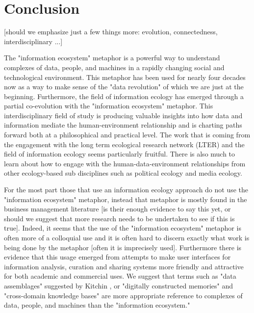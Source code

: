 \section{Conclusion}

[should we emphasize just a few things more: evolution, connectedness, interdisciplinary ...]

The "information ecosystem" metaphor is a powerful way to understand complexes of data, people, and machines in a rapidly changing social and technological environment. This metaphor has been used for nearly four decades now as a way to make sense of the "data revolution" of which we are just at the beginning. Furthermore, the field of information ecology has emerged through a partial co-evolution with the "information ecosystem" metaphor. This interdisciplinary field of study is producing valuable insights into how data and information mediate the human-environment relationship and is charting paths forward both at a philosophical and practical level. The work that is coming from the engagement with the long term ecological research network (LTER) and the field of information ecology seems particularly fruitful. There is also much to learn about how to engage with the human-data-environment relationships from other ecology-based sub disciplines such as political ecology and media ecology. 

For the most part those that use an information ecology approach do not use the "information ecosystem" metaphor, instead that metaphor is mostly found in the business management literature [is their enough evidence to say this yet, or should we suggest that more research needs to be undertaken to see if this is true]. Indeed, it seems that the use of the "information ecosystem" metaphor is often more of a colloquial use and it is often hard to discern exactly what work is being done by the metaphor [often it is imprecisely used]. Furthermore there is evidence that this usage emerged from attempts to make user interfaces for information analysis, curation and sharing systems more friendly and attractive for both academic and commercial uses. We suggest that terms such as "data assemblages" suggested by Kitchin \citep{kitchin_2014}, or "digitally constructed memories" and "cross-domain knowledge bases" \citep{baker_2007} are more appropriate reference to complexes of data, people, and machines than the "information ecosystem." 

